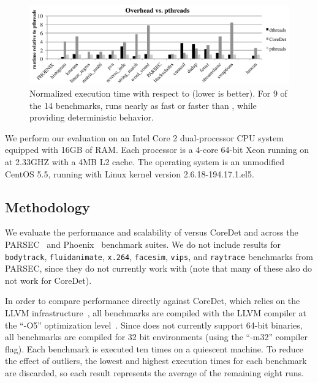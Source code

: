 \label{sec:evaluation}

\begin{figure}[!t]
{\centering
\includegraphics[width=5in]{dthreads/figure/overhead-figure}
\caption{Normalized execution time with respect to \pthreads{} (lower is better). For 9 of the 14 benchmarks, \dthreads{} runs nearly as fast or faster than \pthreads{}, while providing deterministic behavior.\label{fig:performance}}
}
\end{figure}



We perform our evaluation on an Intel Core 2 dual-processor CPU system
equipped with 16GB of RAM. Each processor is a 4-core 64-bit Xeon
running on at 2.33GHZ with a 4MB L2 cache.  The operating system is an
unmodified CentOS 5.5, running with Linux kernel version
2.6.18-194.17.1.el5.

\subsection{Methodology}

We evaluate the performance and scalability of \dthreads{} versus
CoreDet and \pthreads{} across the PARSEC~\cite{parsec} and
Phoenix~\cite{phoenix-hpca} benchmark suites.  We do not include
results for \texttt{bodytrack}, \texttt{fluidanimate}, \texttt{x.264},
\texttt{facesim}, \texttt{vips}, and \texttt{raytrace} benchmarks from PARSEC, 
since they do not currently work with \dthreads{} (note that many of
these also do not work for CoreDet).

In order to compare performance directly against CoreDet, which relies
on the LLVM infrastructure~\cite{LLVM:CGO04}, all benchmarks are
compiled with the LLVM compiler at the ``-O5'' optimization
level~\cite{LLVM:CGO04}. Since \dthreads{} does not currently support
64-bit binaries, all benchmarks are compiled for 32 bit environments
(using the ``-m32'' compiler flag). Each benchmark is executed ten
times on a quiescent machine. To reduce the effect of outliers, the
lowest and highest execution times for each benchmark are discarded,
so each result represents the average of the remaining eight runs.

